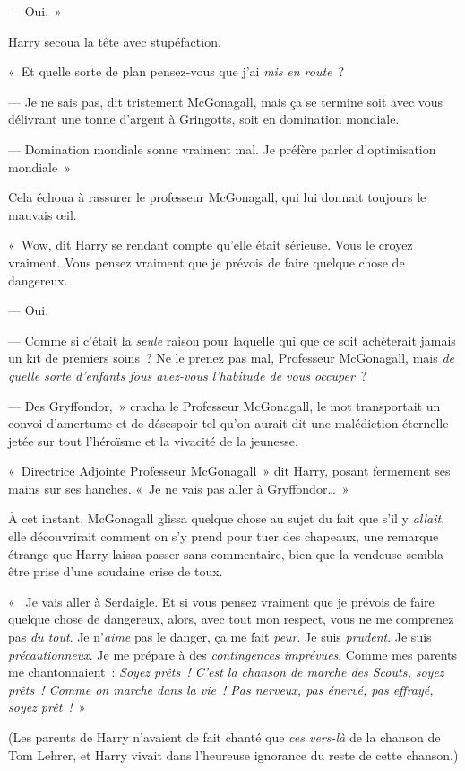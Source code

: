 --- Oui.~»

Harry secoua la tête avec stupéfaction.

«~Et quelle sorte de plan pensez-vous que j'ai \emph{mis} \emph{en route}~?

--- Je ne sais pas, dit tristement McGonagall, mais ça se termine soit avec vous délivrant une tonne d'argent à Gringotts, soit en domination mondiale.

--- Domination mondiale sonne vraiment mal. Je préfère parler d'optimisation mondiale~»

Cela échoua à rassurer le professeur McGonagall, qui lui donnait toujours le mauvais œil.

«~Wow, dit Harry se rendant compte qu'elle était sérieuse. Vous le croyez vraiment. Vous pensez vraiment que je prévois de faire quelque chose de dangereux.

--- Oui.

--- Comme si c'était la \emph{seule} raison pour laquelle qui que ce soit achèterait jamais un kit de premiers soins~? Ne le prenez pas mal, Professeur McGonagall, mais \emph{de quelle sorte d'enfants fous avez-vous l'habitude de vous occuper}~?

--- Des Gryffondor,~» cracha le Professeur McGonagall, le mot transportait un convoi d'amertume et de désespoir tel qu'on aurait dit une malédiction éternelle jetée sur tout l'héroïsme et la vivacité de la jeunesse.

«~Directrice Adjointe Professeur McGonagall~» dit Harry, posant fermement ses mains sur ses hanches. «~Je ne vais pas aller à Gryffondor…~»

À cet instant, McGonagall glissa quelque chose au sujet du fait que s'il y \emph{allait}, elle découvrirait comment on s'y prend pour tuer des chapeaux, une remarque étrange que Harry laissa passer sans commentaire, bien que la vendeuse sembla être prise d'une soudaine crise de toux.

«~ Je vais aller à Serdaigle. Et si vous pensez vraiment que je prévois de faire quelque chose de dangereux, alors, avec tout mon respect, vous ne me comprenez pas \emph{du tout}. Je n'\emph{aime} pas le danger, ça me fait \emph{peur}. Je suis \emph{prudent}. Je suis \emph{précautionneux}. Je me prépare à des \emph{contingences imprévues}. Comme mes parents me chantonnaient~: \emph{Soyez prêts~! C'est la chanson de marche des Scouts, soyez prêts~! Comme on marche dans la vie~! Pas nerveux, pas énervé, pas effrayé, soyez prêt~!}~»

(Les parents de Harry n'avaient de fait chanté que \emph{ces vers-là} de la chanson de Tom Lehrer, et Harry vivait dans l'heureuse ignorance du reste de cette chanson.)

